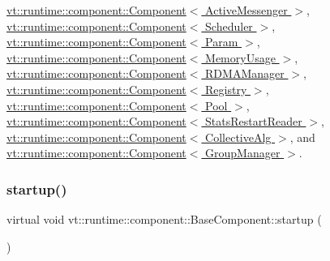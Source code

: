 \hyperlink{structvt_1_1runtime_1_1component_1_1_component_a5a15bd0369a9d3765a6c70249bada96f}{vt\+::runtime\+::component\+::\+Component$<$ Active\+Messenger $>$}, \hyperlink{structvt_1_1runtime_1_1component_1_1_component_a5a15bd0369a9d3765a6c70249bada96f}{vt\+::runtime\+::component\+::\+Component$<$ Scheduler $>$}, \hyperlink{structvt_1_1runtime_1_1component_1_1_component_a5a15bd0369a9d3765a6c70249bada96f}{vt\+::runtime\+::component\+::\+Component$<$ Param $>$}, \hyperlink{structvt_1_1runtime_1_1component_1_1_component_a5a15bd0369a9d3765a6c70249bada96f}{vt\+::runtime\+::component\+::\+Component$<$ Memory\+Usage $>$}, \hyperlink{structvt_1_1runtime_1_1component_1_1_component_a5a15bd0369a9d3765a6c70249bada96f}{vt\+::runtime\+::component\+::\+Component$<$ R\+D\+M\+A\+Manager $>$}, \hyperlink{structvt_1_1runtime_1_1component_1_1_component_a5a15bd0369a9d3765a6c70249bada96f}{vt\+::runtime\+::component\+::\+Component$<$ Registry $>$}, \hyperlink{structvt_1_1runtime_1_1component_1_1_component_a5a15bd0369a9d3765a6c70249bada96f}{vt\+::runtime\+::component\+::\+Component$<$ Pool $>$}, \hyperlink{structvt_1_1runtime_1_1component_1_1_component_a5a15bd0369a9d3765a6c70249bada96f}{vt\+::runtime\+::component\+::\+Component$<$ Stats\+Restart\+Reader $>$}, \hyperlink{structvt_1_1runtime_1_1component_1_1_component_a5a15bd0369a9d3765a6c70249bada96f}{vt\+::runtime\+::component\+::\+Component$<$ Collective\+Alg $>$}, and \hyperlink{structvt_1_1runtime_1_1component_1_1_component_a5a15bd0369a9d3765a6c70249bada96f}{vt\+::runtime\+::component\+::\+Component$<$ Group\+Manager $>$}.

\mbox{\label{structvt_1_1runtime_1_1component_1_1_base_component_a8bf92f9f0a7027abf7deaefa2e7f5202}} 
\subsubsection{\texorpdfstring{startup()}{startup()}}
{\footnotesize\ttfamily virtual void vt\+::runtime\+::component\+::\+Base\+Component\+::startup (\begin{DoxyParamCaption}{ }\end{DoxyParamCaption})\hspace{0.3cm}{\ttfamily [pure virtual]}}



